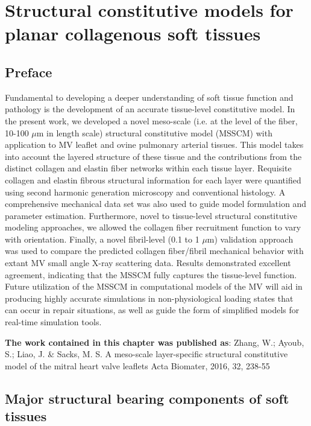 \chapter{Structural constitutive models for planar collagenous soft tissues}


\section*{Preface}
%

    Fundamental to developing a deeper understanding of soft tissue function and pathology is the development of an accurate tissue-level constitutive model. In the present work, we developed a novel meso-scale (i.e. at the level of the fiber, 10-100 $\mu$m in length scale) structural constitutive model (MSSCM) with application to MV leaflet and ovine pulmonary arterial tissues. This model takes into account the layered structure of these tissue and the contributions from the distinct collagen and elastin fiber networks within each tissue layer. Requisite collagen and elastin fibrous structural information for each layer were quantified using second harmonic generation microscopy and conventional histology. A comprehensive mechanical data set was also used to guide model formulation and parameter estimation. Furthermore, novel to tissue-level structural constitutive modeling approaches, we allowed the collagen fiber recruitment function to vary with orientation. Finally, a novel fibril-level (0.1 to 1 $\mu$m) validation approach was used to compare the predicted collagen fiber/fibril mechanical behavior with extant MV small angle X-ray scattering data. Results demonstrated excellent agreement, indicating that the MSSCM fully captures the tissue-level function. Future utilization of the MSSCM in computational models of the MV will aid in producing highly accurate simulations in non-physiological loading states that can occur in repair situations, as well as guide the form of simplified models for real-time simulation tools.

\textbf{The work contained in this chapter was published as}:  Zhang, W.; Ayoub, S.; Liao, J. \& Sacks, M. S.
A meso-scale layer-specific structural constitutive model of the mitral heart valve leaflets 
Acta Biomater, 2016, 32, 238-55 





\section{Major structural bearing components of soft tissues}
